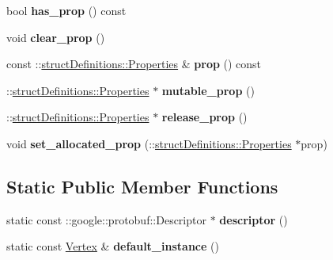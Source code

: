 \begin{DoxyCompactItemize}
\item 
\hypertarget{classstruct_definitions_1_1_vertex_affb042f72ee63b556b91e97ba4f8b6d5}{}\label{classstruct_definitions_1_1_vertex_affb042f72ee63b556b91e97ba4f8b6d5} 
bool {\bfseries has\+\_\+prop} () const
\item 
\hypertarget{classstruct_definitions_1_1_vertex_a9da74e9307187877b31acbe1694d59c3}{}\label{classstruct_definitions_1_1_vertex_a9da74e9307187877b31acbe1694d59c3} 
void {\bfseries clear\+\_\+prop} ()
\item 
\hypertarget{classstruct_definitions_1_1_vertex_adb0634a714a10ca31db64ae7ddda7d4d}{}\label{classstruct_definitions_1_1_vertex_adb0634a714a10ca31db64ae7ddda7d4d} 
const \+::\hyperlink{classstruct_definitions_1_1_properties}{struct\+Definitions\+::\+Properties} \& {\bfseries prop} () const
\item 
\hypertarget{classstruct_definitions_1_1_vertex_aa5bae167fe4877432e099209b070e118}{}\label{classstruct_definitions_1_1_vertex_aa5bae167fe4877432e099209b070e118} 
\+::\hyperlink{classstruct_definitions_1_1_properties}{struct\+Definitions\+::\+Properties} $\ast$ {\bfseries mutable\+\_\+prop} ()
\item 
\hypertarget{classstruct_definitions_1_1_vertex_a69106560474870cbbaa457adcb1639f8}{}\label{classstruct_definitions_1_1_vertex_a69106560474870cbbaa457adcb1639f8} 
\+::\hyperlink{classstruct_definitions_1_1_properties}{struct\+Definitions\+::\+Properties} $\ast$ {\bfseries release\+\_\+prop} ()
\item 
\hypertarget{classstruct_definitions_1_1_vertex_a2fb5e03af39dc21bbcb67c110cae4ed6}{}\label{classstruct_definitions_1_1_vertex_a2fb5e03af39dc21bbcb67c110cae4ed6} 
void {\bfseries set\+\_\+allocated\+\_\+prop} (\+::\hyperlink{classstruct_definitions_1_1_properties}{struct\+Definitions\+::\+Properties} $\ast$prop)
\end{DoxyCompactItemize}
\subsection*{Static Public Member Functions}
\begin{DoxyCompactItemize}
\item 
\hypertarget{classstruct_definitions_1_1_vertex_a77ec7e9155658f3aaabbabcf8556aa5e}{}\label{classstruct_definitions_1_1_vertex_a77ec7e9155658f3aaabbabcf8556aa5e} 
static const \+::google\+::protobuf\+::\+Descriptor $\ast$ {\bfseries descriptor} ()
\item 
\hypertarget{classstruct_definitions_1_1_vertex_ac4a9b3f33723c893ac74b2ae03cdb51e}{}\label{classstruct_definitions_1_1_vertex_ac4a9b3f33723c893ac74b2ae03cdb51e} 
static const \hyperlink{classstruct_definitions_1_1_vertex}{Vertex} \& {\bfseries default\+\_\+instance} ()
\end{DoxyCompactItemize}
